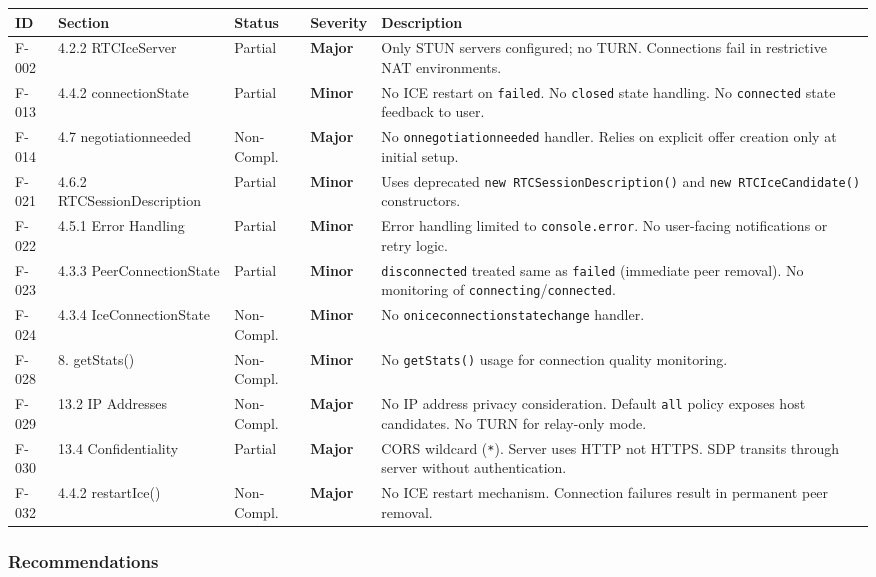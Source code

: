\documentclass[11pt,letterpaper]{article}
\newcommand{\sevmajor}{\textcolor{major}{\textbf{Major}}}
\newcommand{\sevminor}{\textcolor{minor!80!black}{\textbf{Minor}}}
\begin{document}
\begin{longtable}{C{1cm}L{2.5cm}C{1.5cm}C{1.2cm}L{7cm}}
\toprule
\textbf{ID} & \textbf{Section} & \textbf{Status} & \textbf{Severity} & \textbf{Description} \\
\midrule
\endhead
F-002 & 4.2.2 RTCIceServer & Partial & \sevmajor & Only STUN servers configured; no TURN. Connections fail in restrictive NAT environments. \\
\midrule
F-013 & 4.4.2 connectionState & Partial & \sevminor & No ICE restart on \texttt{failed}. No \texttt{closed} state handling. No \texttt{connected} state feedback to user. \\
\midrule
F-014 & 4.7 negotiationneeded & Non-Compl. & \sevmajor & No \texttt{onnegotiationneeded} handler. Relies on explicit offer creation only at initial setup. \\
\midrule
F-021 & 4.6.2 RTCSessionDescription & Partial & \sevminor & Uses deprecated \texttt{new RTCSessionDescription()} and \texttt{new RTCIceCandidate()} constructors. \\
\midrule
F-022 & 4.5.1 Error Handling & Partial & \sevminor & Error handling limited to \texttt{console.error}. No user-facing notifications or retry logic. \\
\midrule
F-023 & 4.3.3 PeerConnectionState & Partial & \sevminor & \texttt{disconnected} treated same as \texttt{failed} (immediate peer removal). No monitoring of \texttt{connecting}/\texttt{connected}. \\
\midrule
F-024 & 4.3.4 IceConnectionState & Non-Compl. & \sevminor & No \texttt{oniceconnectionstatechange} handler. \\
\midrule
F-028 & 8. getStats() & Non-Compl. & \sevminor & No \texttt{getStats()} usage for connection quality monitoring. \\
\midrule
F-029 & 13.2 IP Addresses & Non-Compl. & \sevmajor & No IP address privacy consideration. Default \texttt{all} policy exposes host candidates. No TURN for relay-only mode. \\
\midrule
F-030 & 13.4 Confidentiality & Partial & \sevmajor & CORS wildcard (\texttt{*}). Server uses HTTP not HTTPS. SDP transits through server without authentication. \\
\midrule
F-032 & 4.4.2 restartIce() & Non-Compl. & \sevmajor & No ICE restart mechanism. Connection failures result in permanent peer removal. \\
\bottomrule
\end{longtable}

\subsubsection{Recommendations}
\end{document}
